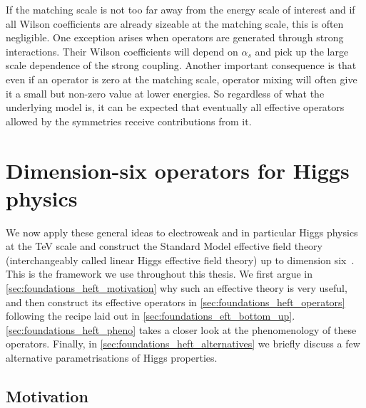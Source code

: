 If the matching scale is not too far away from the energy scale of
interest and if all Wilson coefficients are already sizeable at the
matching scale, this is often negligible. One exception arises when
operators are generated through strong interactions. Their Wilson
coefficients will depend on $\alpha_s$ and pick up the large scale
dependence of the strong coupling. Another important consequence is
that even if an operator is zero at the matching scale, operator
mixing will often give it a small but non-zero value at lower
energies. So regardless of what the underlying model is, it can be
expected that eventually all effective operators allowed by the
symmetries receive contributions from it.



\section{Dimension-six operators for Higgs physics}
\label{sec:foundations_higgs_eft}

We now apply these general ideas to electroweak and in particular
Higgs physics at the TeV scale and construct the Standard Model
effective field theory (interchangeably called linear Higgs effective
field theory) up to dimension six~\cite{Burges:1983zg, Leung:1984ni,
  Buchmuller:1985jz, Arzt:1994gp}. This is the framework we use
throughout this thesis. We first argue in
\autoref{sec:foundations_heft_motivation} why such an effective theory
is very useful, and then construct its effective operators in
\autoref{sec:foundations_heft_operators} following the recipe laid out
in
\autoref{sec:foundations_eft_bottom_up}. \autoref{sec:foundations_heft_pheno}
takes a closer look at the phenomenology of these operators. Finally,
in \autoref{sec:foundations_heft_alternatives} we briefly discuss a
few alternative parametrisations of Higgs properties.


  

\subsection{Motivation}
\label{sec:foundations_heft_motivation}


